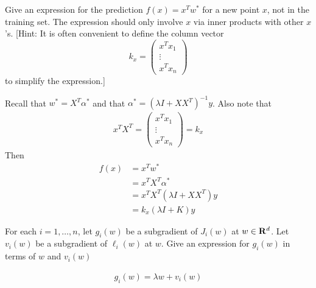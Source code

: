 \documentclass[12pt,letterpaper]{article}
\begin{document}
\begin{problem}{3.6}
     Give an expression for the prediction $f(x)=x^{T}w^{*}$ for a new
    point $x$, not in the training set. The expression should only involve
    $x$ via inner products with other $x$'s. {[}Hint: It is often convenient
    to define the column vector
    \[
    k_{x}=\begin{pmatrix}x^{T}x_{1}\\
    \vdots\\
    x^{T}x_{n}
    \end{pmatrix}
    \]
    to simplify the expression.{]}
\end{problem}
\begin{solution}{}
    Recall that $w^* = X^T\alpha^*$ and that $\alpha^* = (\lambda I + XX^T)^{-1}y$.
    Also note that
    \begin{align*}
        x^TX^T = \begin{pmatrix}x^{T}x_{1}\\
                    \vdots\\
                    x^{T}x_{n}
                    \end{pmatrix} = k_x
    \end{align*}
    Then
    \begin{align*}
        f(x) &= x^Tw^*\\
        &= x^TX^T\alpha^*\\
        &= x^TX^T(\lambda I + XX^T)y\\
        &= k_x(\lambda I + K)y
    \end{align*}
\end{solution}
\newpage

\begin{problem}{4.1}
For each $i=1,\ldots,n$, let $g_{i}(w)$ be a subgradient
of $J_{i}(w)$ at $w\in\mathbf{R}^{d}$. Let $v_{i}(w)$ be a subgradient
of $\ell_{i}(w)$ at $w$. Give an expression for $g_{i}(w)$ in terms
of $w$ and $v_{i}(w)$
\end{problem}
\begin{solution}{}
    \begin{align*}
        g_i(w) = \lambda w + v_i(w)
    \end{align*}
\end{solution}
\newpage
\end{document}
